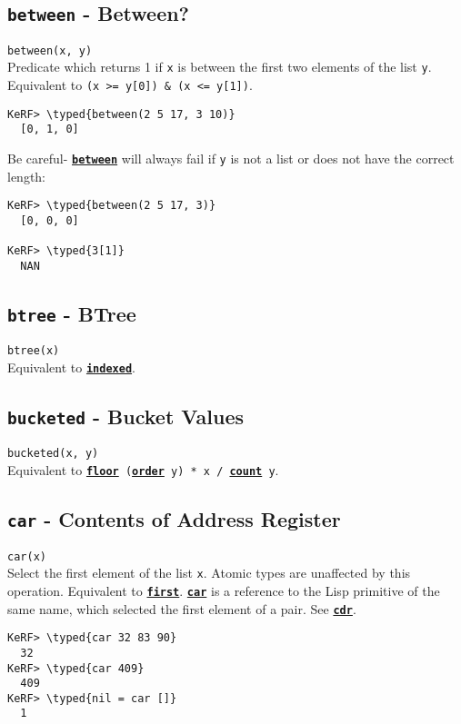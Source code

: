 \documentclass{article}
\newcommand{\typed}[1]{\textcolor{TealBlue}{#1}}
\newcommand{\primdefu}[3]{\subsection{\texttt{#1} - #2}\label{prim:#3}}
\newcommand{\primu}[2]{\hyperref[prim:#2]{\textbf{\texttt{#1}}}}
\newcommand{\primdef}[2]{\primdefu{#1}{#2}{#1}}
\newcommand{\prim}[1]{\primu{#1}{#1}}
\begin{document}

%
\pagebreak
\primdef{between}{Between?}
\texttt{between(x, y)}\\

Predicate which returns 1 if \texttt{x} is between the first two elements of the list \texttt{y}. Equivalent to \texttt{(x >= y[0]) \& (x <= y[1])}.
\begin{Verbatim}
KeRF> \typed{between(2 5 17, 3 10)}
  [0, 1, 0]
\end{Verbatim}

Be careful- \prim{between} will always fail if \texttt{y} is not a list or does not have the correct length:
\begin{Verbatim}
KeRF> \typed{between(2 5 17, 3)}
  [0, 0, 0]

KeRF> \typed{3[1]}
  NAN
\end{Verbatim}

\primdef{btree}{BTree}
\texttt{btree(x)}\\

Equivalent to \prim{indexed}.

\primdef{bucketed}{Bucket Values}
\texttt{bucketed(x, y)}\\

Equivalent to \texttt{\prim{floor} (\prim{order} y) * x / \prim{count} y}.

\primdef{car}{Contents of Address Register} %
\texttt{car(x)}\\

Select the first element of the list \texttt{x}. Atomic types are unaffected by this operation. Equivalent to \prim{first}. \prim{car} is a reference to the Lisp primitive of the same name, which selected the first element of a pair. See \prim{cdr}.

\begin{Verbatim}
KeRF> \typed{car 32 83 90}
  32
KeRF> \typed{car 409}
  409
KeRF> \typed{nil = car []}
  1
\end{Verbatim}
\end{document}
